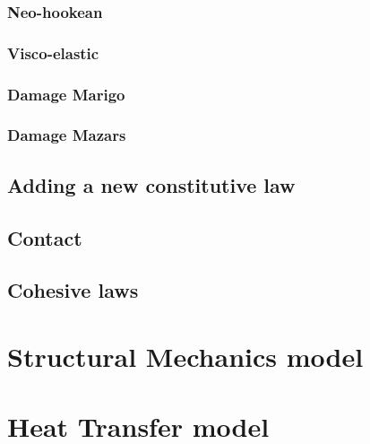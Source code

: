 \documentclass[a4paper,11pt]{book}
\begin{document}
\subsubsection{Neo-hookean}
\subsubsection{Visco-elastic}
\subsubsection{Damage Marigo}
\subsubsection{Damage Mazars}

\subsection{Adding a new constitutive law}

\subsection{Contact}

\subsection{Cohesive laws}


\section{Structural Mechanics model}

\section{Heat Transfer model}

\end{document}
